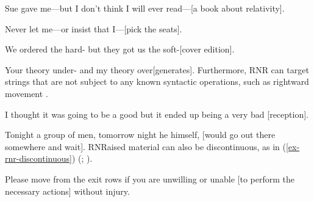 \eal
\ex Sue gave me---but I don't think I will ever read---[a book about relativity]. \label{54}

\ex Never let me---or insist that I---[pick the seats].\label{55}

\ex We ordered the hard- but they got us the soft-[cover edition].\label{56}

\ex Your theory under- and my theory over[generates].\label{57}\zl
%
Furthermore, RNR can target strings that are not subject to any known syntactic operations, such as rightward movement \citep[865]{Chaves2014}.

\eal
\ex I thought it was going to be a good but it ended up being a very bad [reception].\label{58}

\ex Tonight a group of men, tomorrow night he himself, [would go out there somewhere and wait].\label{59}\zl
RNRaised material can also be discontinuous, as in (\ref{ex-rnr-discontinuous}) (\citealt[868]{Chaves2014}; \citealt[238--240]{Whitman2009}).

\eal
\label{ex-rnr-discontinuous}
\ex Please move from the exit rows if you are unwilling or unable [to perform the necessary actions] without injury.\label{61}

